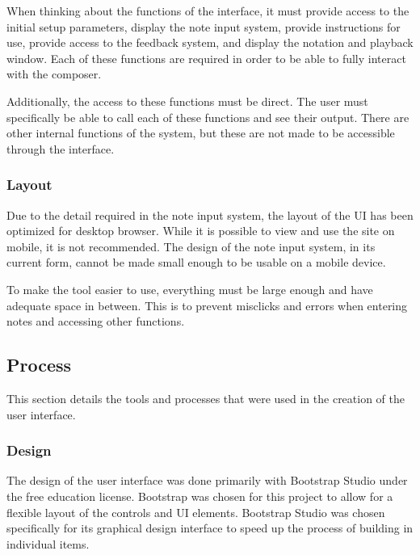 When thinking about the functions of the interface, it must provide access to the initial setup parameters, display the note input system, provide instructions for use, provide access to the feedback system, and display the notation and playback window.  Each of these functions are required in order to be able to fully interact with the composer.

\vspace{\baselineskip}

Additionally, the access to these functions must be direct.  The user must specifically be able to call each of these functions and see their output.  There are other internal functions of the system, but these are not made to be accessible through the interface.

\subsubsection{Layout}
\label{subsubsec:methodologylayout}

Due to the detail required in the note input system, the layout of the UI has been optimized for desktop browser.  While it is possible to view and use the site on mobile, it is not recommended.  The design of the note input system, in its current form, cannot be made small enough to be usable on a mobile device.

\vspace{\baselineskip}

To make the tool easier to use, everything must be large enough and have adequate space in between.  This is to prevent misclicks and errors when entering notes and accessing other functions.

\subsection{Process}
\label{subsec:process}

This section details the tools and processes that were used in the creation of the user interface.

\subsubsection{Design}
\label{subsubsec:processdesign}

The design of the user interface was done primarily with Bootstrap Studio under the free education license.  Bootstrap was chosen for this project to allow for a flexible layout of the controls and UI elements.  Bootstrap Studio was chosen specifically for its graphical design interface to speed up the process of building in individual items.

